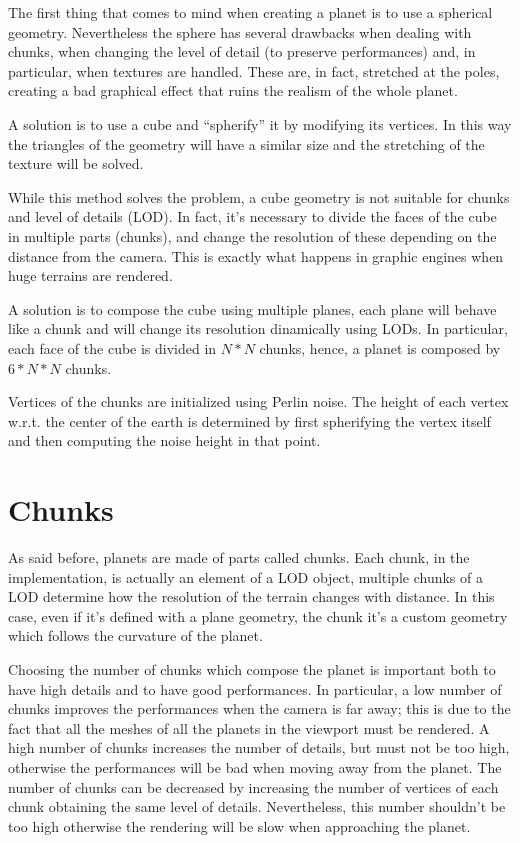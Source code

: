 \documentclass[paper=a4, fontsize=11pt]{scrartcl} %
\numberwithin{equation}{section} %
\numberwithin{figure}{section} %
\numberwithin{table}{section} %
\theoremstyle{definition}
\begin{document}
The first thing that comes to mind when creating a planet is to use a spherical
geometry. Nevertheless the sphere has several drawbacks when dealing with
chunks, when changing the level of detail (to preserve performances) and, in
particular, when textures are handled. These are, in fact, stretched at the poles,
creating a bad graphical effect that ruins the realism of the whole planet.

A solution is to use a cube and ``spherify'' it by modifying its vertices.
In this way the triangles of the geometry will have a similar size and the
stretching of the texture will be solved.

While this method solves the problem, a cube geometry is not suitable for chunks
and level of details (LOD). In fact, it's
necessary to divide the faces of the cube in multiple parts (chunks),
and change the resolution of these depending on the distance from the camera.
This is exactly what happens in graphic engines when huge terrains are
rendered.

A solution is to compose the cube using multiple planes, each plane will
behave like a chunk and will change its resolution dinamically using LODs.
In particular, each face of the cube is divided in $N*N$ chunks, hence, a
planet is composed by $6*N*N$ chunks.

Vertices of the chunks are initialized using Perlin noise. The height of each
vertex w.r.t. the center of the earth is determined by first spherifying the
vertex itself and then computing the noise height in that point.


\section{Chunks}

As said before, planets are made of parts called chunks. Each chunk, in the
implementation, is actually an element of a LOD object, multiple chunks of a
LOD determine how the resolution of the terrain changes with distance.
In this case, even if it's defined with a plane geometry, the chunk it's
a custom geometry which follows the curvature of the planet.

Choosing the number of chunks which compose the planet is important both to
have high details and to have good performances. In particular, a low number
of chunks improves the performances when the camera is far away; this is due
to the fact that all the meshes of all the planets in the viewport must be
rendered. A high number of chunks increases the number of details, but
must not be too high, otherwise the performances will be bad when moving away
from the planet. The number of chunks can be decreased by increasing the
number of vertices of each chunk obtaining the same level of details.
Nevertheless, this number shouldn't be
too high otherwise the rendering will be slow when approaching the planet. 
\end{document}
